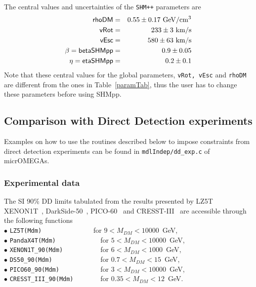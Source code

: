 \documentclass[12pt,a4paper]{article}
\begin{document}
The central values  and uncertainties   of   the {\tt SHM++} parameters are  
\begin{eqnarray}
\nonumber 
\textsf{rhoDM} &=&0.55\pm 0.17 ~{\rm GeV}/{\rm cm}^3\\
\nonumber
\textsf{vRot}&=& 233\pm 3 ~{\rm km/s}\\
\nonumber
\textsf{vEsc}&=& 580\pm 63~ {\rm km/s}\\
\nonumber
 \beta=\textsf{betaSHMpp} &=&0.9\pm 0.05\\
\eta= \textsf{etaSHMpp} &=& 0.2\pm 0.1 
\label{eq:SHMpp} 
\end{eqnarray}
\noindent
Note that these central values for the global parameters, {\tt vRot, vEsc} and {\tt rhoDM}   
are different from  the  ones in Table~\ref{paramTab}, thus the user has  to change these parameters before  using SHMpp.
 






\subsection{Comparison with Direct Detection experiments} 
\label{DDexp}

Examples on how to use the routines described below to impose constraints from direct detection experiments  can be found  in \verb|mdlIndep/dd_exp.c| of micrOMEGAs. 
\subsubsection{Experimental data}

The SI 90\%  DD  limits  tabulated from the results presented by LZ5T~\cite{LZ:2022lsv} XENON1T~\cite{Aprile:2018dbl}, DarkSide-50~\cite{Agnes:2018ves}, PICO-60~\cite{Amole:2019fdf}  and CRESST-III~\cite{Abdelhameed:2019hmk}  are accessible through  the following functions \\

\noindent
\noindent
$\bullet$ \verb|LZ5T(Mdm)              |  for $ 9 < M_{DM} < 10000$~GeV, \cite{LZ:2022lsv} \\
$\bullet$ \verb|PandaX4T(Mdm)            |  for $ 5 < M_{DM} < 10000$~GeV, \cite{PandaX-4T:2021bab} \\
$\bullet$ \verb|XENON1T_90(Mdm)          | for  $ 6 <  M_{DM} < 1000$~GeV, \cite{Aprile:2018dbl}  \\
\noindent
$\bullet$ \verb|DS50_90(Mdm)             | for  $ 0.7 < M_{DM} < 15$~GeV, \cite{Agnes:2018ves}   \\
\noindent
$\bullet$ \verb|PICO60_90(Mdm)           | for  $ 3 < M_{DM} < 10000$~GeV, \cite{Amole:2019fdf}   \\
\noindent
$\bullet$ \verb|CRESST_III_90(Mdm)       |  for $ 0.35 < M_{DM} < 12$~GeV. \cite{Abdelhameed:2019hmk} \\
\end{document}
